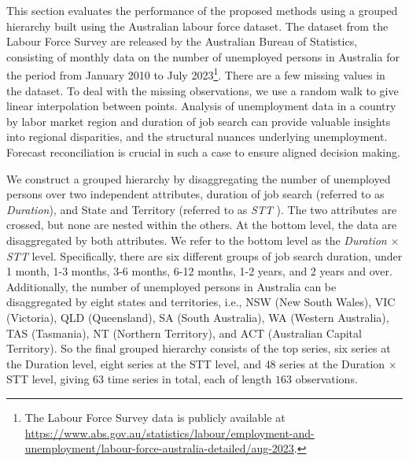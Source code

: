 \documentclass[11pt,a4paper,]{article}
\begin{document}
This section evaluates the performance of the proposed methods using a
grouped hierarchy built using the Australian labour force dataset. The
dataset from the Labour Force Survey are released by the Australian
Bureau of Statistics, consisting of monthly data on the number of
unemployed persons in Australia for the period from January 2010 to July
2023\footnote{The Labour Force Survey data is publicly available at
  \url{https://www.abs.gov.au/statistics/labour/employment-and-unemployment/labour-force-australia-detailed/aug-2023}.}.
There are a few missing values in the dataset. To deal with the missing
observations, we use a random walk to give linear interpolation between
points. Analysis of unemployment data in a country by labor market
region and duration of job search can provide valuable insights into
regional disparities, and the structural nuances underlying
unemployment. Forecast reconciliation is crucial in such a case to
ensure aligned decision making.

We construct a grouped hierarchy by disaggregating the number of
unemployed persons over two independent attributes, duration of job
search (referred to as \emph{Duration}), and State and Territory
(referred to as \emph{STT} ). The two attributes are crossed, but none
are nested within the others. At the bottom level, the data are
disaggregated by both attributes. We refer to the bottom level as the
\emph{Duration} \(\times\) \emph{STT} level. Specifically, there are six
different groups of job search duration, under 1 month, 1-3 months, 3-6
months, 6-12 months, 1-2 years, and 2 years and over. Additionally, the
number of unemployed persons in Australia can be disaggregated by eight
states and territories, i.e., NSW (New South Wales), VIC (Victoria), QLD
(Queensland), SA (South Australia), WA (Western Australia), TAS
(Tasmania), NT (Northern Territory), and ACT (Australian Capital
Territory). So the final grouped hierarchy consists of the top series,
six series at the Duration level, eight series at the STT level, and
\(48\) series at the Duration \(\times\) STT level, giving \(63\) time
series in total, each of length \(163\) observations.
\end{document}
